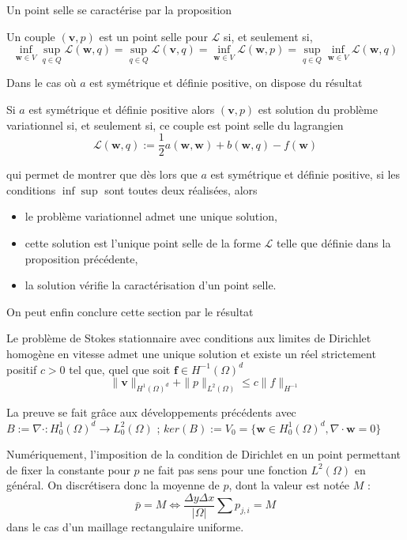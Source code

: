 Un point selle se caractérise par la proposition

\begin{proposition}
    Un couple $(\mathbf{v}, p)$ est un point selle pour $\mathcal{L}$ si, et seulement si,
    $$ \inf_{\mathbf{w} \in V} \sup_{q\in Q} \mathcal{L}(\mathbf{w}, q) = \sup_{q \in Q} \mathcal{L}(\mathbf{v}, q) = \inf_{\mathbf{w}\in V} \mathcal{L}(\mathbf{w}, p) = \sup_{q \in Q} \inf_{\mathbf{w} \in V} \mathcal{L}(\mathbf{w}, q) $$
\end{proposition}

Dans le cas où $a$ est symétrique et définie positive, on dispose du résultat
\begin{proposition}
    Si $a$ est symétrique et définie positive alors $(\mathbf{v}, p)$ est solution du problème variationnel si, et seulement si, ce couple est point selle du lagrangien $$ \mathcal{L}(\mathbf{w}, q) := \frac{1}{2} a(\mathbf{w}, \mathbf{w}) + b(\mathbf{w}, q) - f(\mathbf{w}) $$
\end{proposition}
qui permet de montrer que dès lors que $a$ est symétrique et définie positive, si les conditions $\inf \sup$ sont toutes deux réalisées, alors
\begin{itemize}
    \item le problème variationnel admet une unique solution,
    \item cette solution est l'unique point selle de la forme $\mathcal{L}$ telle que définie dans la proposition précédente,
    \item la solution vérifie la caractérisation d'un point selle.
\end{itemize}

On peut enfin conclure cette section par le résultat 

\begin{theoreme}
    Le problème de Stokes stationnaire avec conditions aux limites de Dirichlet homogène en vitesse admet une unique solution et existe un réel strictement positif $c > 0$ tel que, quel que soit $\mathbf{f} \in H^{-1}(\Omega)^d$ $$ \| \mathbf{v} \|_{H^1(\Omega)^d} + \|p \|_{L^2(\Omega)} \leqslant c \| f \|_{H^{-1}} $$
\end{theoreme}

La preuve se fait grâce aux développements précédents avec $B := \nabla \cdot : H^1_0(\Omega)^d \rightarrow L^2_0(\Omega)$ ; $ker(B) := V_0 = \{ \mathbf{w} \in H^1_0(\Omega)^d, \nabla \cdot \mathbf{w} = 0 \}$

Numériquement, l'imposition de la condition de Dirichlet en un point permettant de fixer la constante pour $p$ ne fait pas sens pour une fonction $L^2(\Omega)$ en général. On discrétisera donc la moyenne de $p$, dont la valeur est notée $M$ : $$ \bar{p} = M \Longleftrightarrow \frac{\Delta y \Delta x}{|\Omega|} \sum p_{j,i} = M $$ dans le cas d'un maillage rectangulaire uniforme.

